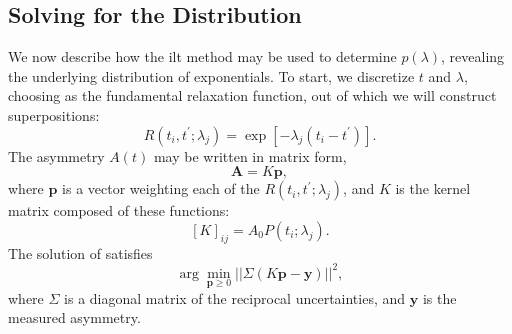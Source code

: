 \subsection{Solving for the Distribution}

We now describe how the \gls{ilt} method may be used to determine $p ( \lambda )$, revealing the underlying distribution of exponentials.
To start, we discretize $t$ and $\lambda$, choosing  as the fundamental relaxation function, out of which we will construct superpositions:
%
\begin{equation} \label{eq:slr-discrete}
   R \left (t_{i}, t^{\prime};\lambda_j \right ) = \exp \left [- \lambda_{j} \left ( t_{i} - t^{\prime} \right ) \right ] .
\end{equation}
%
The asymmetry $A(t)$ may be written in matrix form,
%
\begin{equation} \label{eq:signal-matrix}
   \mathbf{A} = K \mathbf{p},
\end{equation}
%
where $\mathbf{p}$ is a vector weighting each of the $R \left (t_{i}, t^{\prime};\lambda_j \right )$, and $K$ is the kernel matrix composed of these functions:
%
\begin{equation}
   \label{eq:kernel}
   [K]_{ij} = A_{0} P(t_i;\lambda_j).
\end{equation}
%
The solution of  satisfies
%
\begin{equation}
   \label{eq:onnls}
   \arg \min_{\mathbf{p} \geq 0} || \Sigma \left ( K \mathbf{p} - \mathbf{y} \right ) ||^{2} ,
\end{equation}
%
where $\Sigma$ is a diagonal matrix of the reciprocal uncertainties, and $\mathbf{y}$ is the measured asymmetry. 

